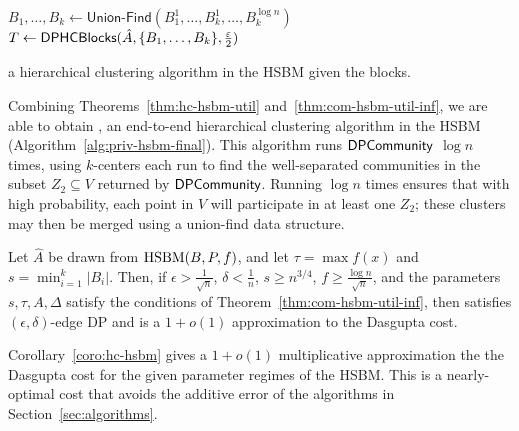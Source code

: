 \begin{algorithm}
$B_1, \ldots, B_k \gets \textsf{Union-Find}(B_1^1, \ldots, B_k^1, \ldots, B_k^{\log n})$\;
$T \gets \textsf{DPHCBlocks}{}(\hat{A}, \{B_1, \ldots, B_k\}, \frac{\varepsilon}{2})$\;
\caption{\dphchsbm{} a hierarchical clustering algorithm in the HSBM given the blocks.}\label{alg:priv-hsbm-final}
\end{algorithm}

Combining Theorems~\ref{thm:hc-hsbm-util} and~\ref{thm:com-hsbm-util-inf}, we are able to obtain \dphchsbm{}, an end-to-end hierarchical clustering algorithm in the HSBM (Algorithm~\ref{alg:priv-hsbm-final}). This algorithm runs $\textsf{DPCommunity}{}$ $\log n$ times, using $k$-centers each run to find the well-separated communities in the subset $Z_2 \subseteq V$ returned by $\textsf{DPCommunity}{}$. Running $\log n$ times ensures that with high probability, each point in $V$ will participate in at least one $Z_2$; these clusters may then be merged using a union-find data structure.
\begin{coro}\label{coro:hc-hsbm}
    Let $\hat{A}$ be drawn from $\textnormal{HSBM}(B,P,f)$, and let $\tau = \max f(x)$ and $s = \min_{i=1}^k|B_i|$. Then, if $\epsilon > \frac{1}{\sqrt{n}}$, $\delta < \frac{1}{n}$, $s \geq n^{3/4}$, $f \geq \frac{\log n}{\sqrt{n}}$, and the parameters $s,\tau,A,\Delta$ satisfy the conditions of Theorem~\ref{thm:com-hsbm-util-inf}, then \dphchsbm{} satisfies $(\epsilon, \delta)$-edge DP and is a $1+o(1)$ approximation to the Dasgupta cost. 
\end{coro}
Corollary~\ref{coro:hc-hsbm} gives a $1+o(1)$ multiplicative approximation the the Dasgupta cost for the given parameter regimes of the HSBM. This is a nearly-optimal cost that avoids the additive error of the algorithms in Section~\ref{sec:algorithms}.
